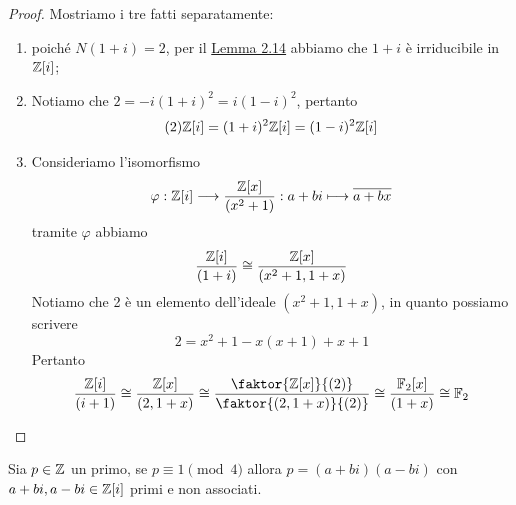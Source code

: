 \documentclass[11pt]{scrartcl}
\begin{document}
	\begin{proof}Mostriamo i tre fatti separatamente:
		\begin{enumerate}[(1)]
			\item poiché $N(1 + i) = 2$, per il \hyperref[lemma2.14]{Lemma 2.14} abbiamo 
			che $1 + i$ è irriducibile in $\mathbb Z[i]$;
			\item Notiamo che $2 = -i(1 + i)^2 = i(1 - i)^2$, pertanto 
			\[
			(2)\mathbb Z[i] = (1 + i)^2\mathbb Z[i] = (1 - i)^2\mathbb Z[i]
			\]
			\item Consideriamo l'isomorfismo 
			\[
			\varphi: \mathbb Z[i]\longrightarrow \frac{\mathbb Z[x]}{(x^2 + 1)}:
			a + bi \longmapsto \overline{a + bx}
			\]
			tramite $\varphi$ abbiamo
			\[
			\frac{\mathbb Z[i]}{(1 + i)} \cong \frac{\mathbb Z[x]}{(x^2 + 1, 1 + x)}
			\]
			Notiamo che 2 è un elemento dell'ideale $(x^2 + 1, 1 + x)$, in quanto 
			possiamo scrivere
			\[
			2 = x^2 + 1 - x(x + 1) + x + 1
			\]
			Pertanto
			\[
			\frac{\ZZ[i]}{(i + 1)} \cong \frac{\ZZ[x]}{(2, 1 + x)} \cong 
			\frac{\faktor{\ZZ[x]}{(2)}}{\faktor{(2, 1 + x)}{(2)}} \cong 
			\frac{\FF_2[x]}{(1 + x)} \cong \FF_2
			\]
		\end{enumerate}
	\end{proof}
	
	\begin{lemma}
		\label{lemma2.16}
		Sia $p \in \mathbb Z$ un primo, se $p \equiv 1 \pmod 4$ allora $p = (a + bi)(a - bi)$
		con $a + bi, a - bi \in \mathbb Z[i]$ primi e non associati.
	\end{lemma}
	
\end{document}
